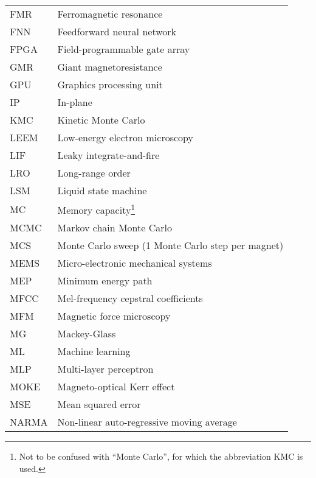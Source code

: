 {\begin{longtable}[l]{ll}
        FMR   & Ferromagnetic resonance                     \\
        FNN   & Feedforward neural network                  \\
        FPGA  & Field-programmable gate array               \\
        GMR   & Giant magnetoresistance                     \\
        GPU   & Graphics processing unit                    \\
        IP    & In-plane                                    \\
        KMC   & Kinetic Monte Carlo                         \\
        LEEM  & Low-energy electron microscopy              \\
        LIF   & Leaky integrate-and-fire                    \\
        LRO   & Long-range order                            \\
        LSM   & Liquid state machine                        \\
        MC    & Memory capacity\footnote{Not to be confused with ``Monte Carlo'', for which the abbreviation KMC is used.} \\
        MCMC  & Markov chain Monte Carlo                    \\
        MCS   & Monte Carlo sweep (1 Monte Carlo step per magnet) \\
        MEMS  & Micro-electronic mechanical systems         \\
        MEP   & Minimum energy path                         \\
        MFCC  & Mel-frequency cepstral coefficients         \\
        MFM   & Magnetic force microscopy                   \\
        MG    & Mackey-Glass                                \\
        ML    & Machine learning                            \\
        MLP   & Multi-layer perceptron                      \\
        MOKE  & Magneto-optical Kerr effect                 \\
        MSE   & Mean squared error                          \\
        NARMA & Non-linear auto-regressive moving average   \\

\end{longtable}}
